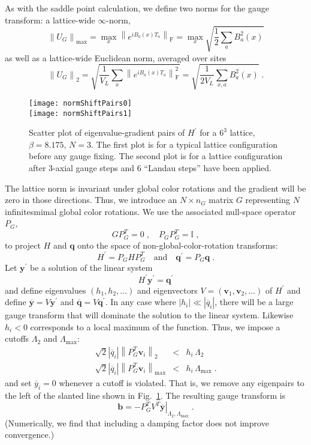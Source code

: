 \documentclass[preprint,aps,prd]{revtex4-2}
\newcommand{\be}{\begin{equation}}
\newcommand{\eq}{\end{equation}}
\newcommand{\heigen}{h}
\newcommand\fnorm[1]{\left\lVert #1 \right\rVert_\mathrm{F}}
\begin{document}
As with the saddle point calculation, we define two
norms for the gauge transform:
a lattice-wide $\infty$-norm,
\be
\left\lVert U_G \right\rVert_{\mathrm{max}} =
     \max_{x} \fnorm{e^{i B_{a}(x) T_a}}
     = \max_{x} \sqrt{\frac{1}{2}\sum_a B_a^2(x)}
\eq
as well as a lattice-wide Euclidean norm, averaged over sites
\be
\left\lVert U_G\right\rVert_2 =
      \sqrt{\frac{1}{V_L} \sum_{x}
        \fnorm{e^{i B_{a}(x) T_a}}^2}
     = \sqrt{\frac{1}{2 V_L} \sum_{x, a} B_a^2(x)}
        \; .  \label{normshiftsize}
\eq

\begin{figure}
\texttt{[image: normShiftPairs0]}\\
\texttt{[image: normShiftPairs1]}
\caption{Scatter plot of eigenvalue-gradient pairs of $H^\prime$
  for a $6^3$ lattice, $\beta = 8.175$, $N=3$.
  The first plot is for a typical lattice configuration before any
  gauge fixing.  The second plot is for a lattice configuration
  after 3-axial gauge steps and 6 ``Landau steps'' have been
  applied.
  \label{normShiftPairs}}
\end{figure}

The lattice norm is invariant under global color rotations and
the gradient will be zero in those directions.
Thus, we introduce an $N\times n_G$ matrix $G$
representing $N$ infinitesmimal global color rotations.
We use the associated null-space operator $P_G$,
\be
G P_G^T = 0 \;, \quad P_G P_G^T = \mathbb{I} \; ,
\eq
to project $H$ and $\mathbf{q}$ onto
the space of non-global-color-rotation transforms:
\be
         H^\prime = P_G H P_G^T \quad \mbox{and} \quad
         \mathbf{q}^\prime = P_G \mathbf{q} \; .
\eq
%
Let $\mathbf{y}^\prime$ be a solution of the linear system
\be
   H^\prime \mathbf{y}^\prime = \mathbf{q}^\prime \label{normlinear2}
\eq
and define eigenvalues
$\left(\heigen_1, \heigen_2, \ldots\right)$ and
eigenvectors $V=\left(\mathbf{v}_1, \mathbf{v}_2, \ldots\right)$
of $H^\prime$ and
define $\overline{\mathbf{y}} = V \mathbf{y}^\prime$ and
$\overline{\mathbf{q}}  = V \mathbf{q}^\prime$.
 In any case where $\left|\heigen_i\right|\ll
\left|\overline{q}_i\right|$,
there will be a large gauge transform that will dominate the solution
to the linear system.
Likewise $\heigen_i<0$ corresponds to a local maximum of the function.
Thus, we impose a cutoffs $\Lambda_2$ and $\Lambda_\mathrm{max}$:
\begin{eqnarray}
    \sqrt{2} \left|\overline{q}_i\right|\left\lVert P_G^T \mathbf{v}_i\right\rVert_2
     &<& \heigen_i \, \Lambda_2 \label{normlambda2}\\
    \sqrt{2} \left|\overline{q}_i\right|
      \left\lVert P_G^T \mathbf{v}_i\right\rVert_\mathrm{max}
    &<& \heigen_i\, \Lambda_\mathrm{max} \; .
\end{eqnarray}
%
and set $\overline{y}_i=0$ whenever a cutoff is violated.
That is, we remove any eigenpairs to the left
of the slanted line shown in Fig.~\ref{normShiftPairs}.
The resulting gauge transform is
\be
      \mathbf{b} = -P_G^T \left. V^T
                    \overline{\mathbf{y}}\right|_{\Lambda_2,\Lambda_\mathrm{max}} \; .
\eq
%
(Numerically, we find that including a damping factor does not
improve convergence.)
\end{document}
